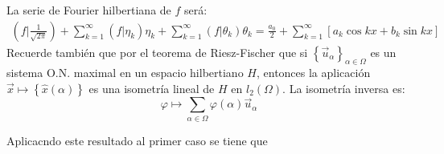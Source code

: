 \documentclass[12pt]{report}
\theoremstyle{largebreak}
\newcommand\pint[2]{\ensuremath{\left(#1\big| #2\right)}}
\begin{document}
    La serie de Fourier hilbertiana de $f$ será:
    \begin{equation*}
        \begin{split}
            \pint{f}{\frac{1}{\sqrt{2\pi}}}+\sum_{ k=1}^\infty \pint{f}{\eta_k}\eta_k+\sum_{ k=1}^\infty \pint{f}{\theta_k}\theta_k=\frac{a_0}{2}+\sum_{ k=1}^\infty\left[a_k\cos kx+b_k\sin kx \right]
        \end{split}
    \end{equation*}
    Recuerde también que por el teorema de Riesz-Fischer que si $\left\{\vec{u}_\alpha \right\}_{\alpha\in\Omega}$ es un sistema O.N. maximal en un espacio hilbertiano $H$, entonces la aplicación $\vec{x}\mapsto\left\{\hat{x}(\alpha) \right\}$ es una isometría lineal de $H$ en $l_2(\Omega)$. La isometría inversa es:
    \begin{equation*}
        \varphi\mapsto \sum_{\alpha\in\Omega}\varphi(\alpha)\vec{u}_\alpha
    \end{equation*}

    Aplicacndo este resultado al primer caso se tiene que
\end{document}
